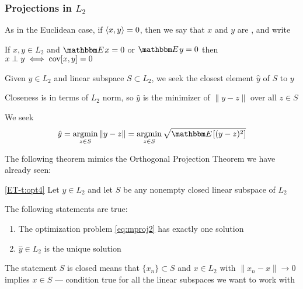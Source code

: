 \begin{frame}\frametitle{Projections in $L_2$}

    \vspace{2em}
    As in the Euclidean case, if $\left\langle{x,y}\right\rangle=0$, then we say that $x$ and $y$
    are , and write 
    
    \vspace{1em}
    \Fact
    If $x, y \in L_2$ and $\EE x=0$ or $\EE y=0$ then $x \perp y
    \iff  \operatorname{cov}[x,y] = 0$
    
\end{frame}

\begin{frame}
    
    \vspace{2em}
    Given $y \in L_2$ and
    linear subspace $S \subset L_2$, we seek the closest element $\hat y$ of $S$
    to $y$
    
    Closeness is in terms of $L_2$ norm, so $\hat y$ is the minimizer of
    $\| y - z \|$ over all $z \in S$
    
    We seek
    \begin{equation}
        \label{eq:mproj2}
        \hat y 
        = \argmin_{z \in S} \|y - z\|
        = \argmin_{z \in S} \sqrt{\EE [ (y - z)^2 ]}
    \end{equation}

\end{frame}

\begin{frame}

    \vspace{2em}
    The following theorem mimics the Orthogonal Projection Theorem we have already seen:
    
    \vspace{.7em}
    \Thm\eqref{ET-t:opt4}
    Let $y \in L_2$ and let $S$ be any nonempty closed
    linear subspace of $L_2$
    
    The following statements are true:
    \begin{enumerate}
        \item The optimization problem \eqref{eq:mproj2} has exactly one solution
        \item $\hat y \in L_2$ is the unique solution
    \end{enumerate}
    The statement  $S$ is closed means that $\{x_n \} \subset S$ and $x
    \in L_2$ with $\| x_n - x \| \to 0$ implies $x \in S$ ---  condition true
    for all the linear subspaces we want to work with
    
\end{frame}

